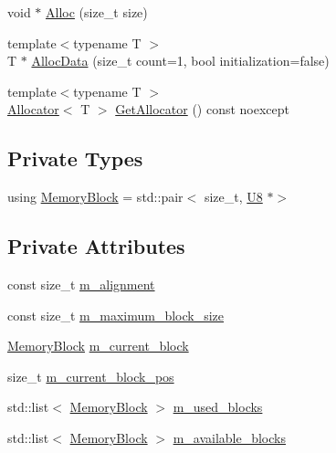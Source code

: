 \begin{DoxyCompactItemize}
\item 
void $\ast$ \mbox{\hyperlink{classmage_1_1_memory_arena_a2e63b11c535dbfefd69d071466be9ce1}{Alloc}} (size\+\_\+t size)
\item 
{\footnotesize template$<$typename T $>$ }\\T $\ast$ \mbox{\hyperlink{classmage_1_1_memory_arena_a0880de049e8e76cd26918528eb892813}{Alloc\+Data}} (size\+\_\+t count=1, bool initialization=false)
\item 
{\footnotesize template$<$typename T $>$ }\\\mbox{\hyperlink{classmage_1_1_memory_arena_1_1_allocator}{Allocator}}$<$ T $>$ \mbox{\hyperlink{classmage_1_1_memory_arena_aa2cc5c42ed20c11900330ace3dfcdc8f}{Get\+Allocator}} () const noexcept
\end{DoxyCompactItemize}
\subsection*{Private Types}
\begin{DoxyCompactItemize}
\item 
using \mbox{\hyperlink{classmage_1_1_memory_arena_a133e9d40bd216e3f1d98c6a2b36cf373}{Memory\+Block}} = std\+::pair$<$ size\+\_\+t, \mbox{\hyperlink{namespacemage_a30677c03d683c4c35630c25f6ff3fb7f}{U8}} $\ast$$>$
\end{DoxyCompactItemize}
\subsection*{Private Attributes}
\begin{DoxyCompactItemize}
\item 
const size\+\_\+t \mbox{\hyperlink{classmage_1_1_memory_arena_a424c3ff6f1d96545dd08f94c1c79c963}{m\+\_\+alignment}}
\item 
const size\+\_\+t \mbox{\hyperlink{classmage_1_1_memory_arena_aeef4c56cf50fd3cbbba2879fcd028b86}{m\+\_\+maximum\+\_\+block\+\_\+size}}
\item 
\mbox{\hyperlink{classmage_1_1_memory_arena_a133e9d40bd216e3f1d98c6a2b36cf373}{Memory\+Block}} \mbox{\hyperlink{classmage_1_1_memory_arena_a2680b25146c174ac7fd639f1bd0acc7c}{m\+\_\+current\+\_\+block}}
\item 
size\+\_\+t \mbox{\hyperlink{classmage_1_1_memory_arena_a880d07eb372ce1c8b907947fcbdfc59c}{m\+\_\+current\+\_\+block\+\_\+pos}}
\item 
std\+::list$<$ \mbox{\hyperlink{classmage_1_1_memory_arena_a133e9d40bd216e3f1d98c6a2b36cf373}{Memory\+Block}} $>$ \mbox{\hyperlink{classmage_1_1_memory_arena_a49a6d7fb9396f57210897abfb4e30903}{m\+\_\+used\+\_\+blocks}}
\item 
std\+::list$<$ \mbox{\hyperlink{classmage_1_1_memory_arena_a133e9d40bd216e3f1d98c6a2b36cf373}{Memory\+Block}} $>$ \mbox{\hyperlink{classmage_1_1_memory_arena_a02f251a5aafa61d239b4daed3458a654}{m\+\_\+available\+\_\+blocks}}
\end{DoxyCompactItemize}



